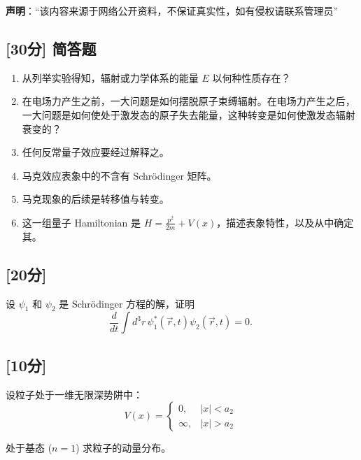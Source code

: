 
\textbf{声明}：“该内容来源于网络公开资料，不保证真实性，如有侵权请联系管理员”

\subsection{[30分] 简答题}
 \begin{enumerate}
        \item 从列举实验得知，辐射或力学体系的能量 $E$ 以何种性质存在？
        \item 在电场力产生之前，一大问题是如何摆脱原子束缚辐射。在电场力产生之后，一大问题是如何使处于激发态的原子失去能量，这种转变是如何使激发态辐射衰变的？
        \item 任何反常量子效应要经过解释之。
        \item 马克效应表象中的不含有 Schrödinger 矩阵。
        \item 马克现象的后续是转移值与转变。
        \item 这一组量子 Hamiltonian 是 $H = \frac{p^2}{2m} + V(x)$，描述表象特性，以及从中确定其。
    \end{enumerate}

\subsection{[20分]}
设 $\psi_1$ 和 $\psi_2$ 是 Schrödinger 方程的解，证明
\[
\frac{d}{dt} \int d^3r \, \psi_1^* (\vec{r}, t) \psi_2 (\vec{r}, t) = 0.~
\]

\subsection{[10分]}
设粒子处于一维无限深势阱中：
\[
V(x) =
\begin{cases}
0, & |x| < a_2 \\
\infty, & |x| > a_2
\end{cases}~
\]

处于基态 ($n=1$) 求粒子的动量分布。

